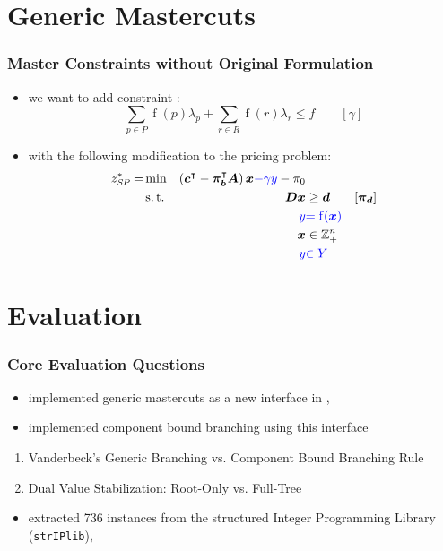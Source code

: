 \documentclass[compress,beamer,aspectratio=169,english,usenames,dvipsnames]{beamer}
\begin{document}
\section{Generic Mastercuts}

\begin{frame}
\frametitle{Master Constraints without Original Formulation}

\begin{itemize}
\item	we want to add constraint \MP{}:
		\begin{equation*}
		\sum_{p \in P} \operatorname{f}(p) \lambda_p + \sum_{r \in R} \operatorname{f}(r) \lambda_r \leq f \qquad \left[\gamma\right]
		\end{equation*}
\item	with the following modification to the pricing problem:
		\begin{equation*}
		\begin{aligned}
		z^*_\SP{} = &\min & \left( \mat{c}\transpose - \mat{\pi}_\mat{b}\transpose \mat{A} \right) \mat{x} {\color{blue} -\gamma y} - \pi_0 & & \\
		&\st & \mat{D} \mat{x} & \geq \mat{d} & \left[\mat{\pi}_\mat{d}\right] \\
		&& {\color{blue} y} & {\color{blue} = \operatorname{f}(\mat{x})} & \\
		&& \mat{x} & \in \mathbb{Z}_+^n \\
		&& {\color{blue} y} & {\color{blue} \in Y}
		\end{aligned}
		\end{equation*}
\end{itemize}
\end{frame}

\section{Evaluation}

\begin{frame}
\frametitle{Core Evaluation Questions}


\begin{itemize}
\item	implemented generic mastercuts as a new interface in \GCG{}, \cite{gamrath2010generic}
\item	implemented component bound branching using this interface
\end{itemize}
\vspace{1em}
\pause
\begin{enumerate}
\item	Vanderbeck's Generic Branching vs. Component Bound Branching Rule
\item	Dual Value Stabilization: Root-Only vs. Full-Tree
\end{enumerate}
\vspace{1em}
\pause
\begin{itemize}
\item	extracted 736 instances from the structured Integer Programming Library (\texttt{strIPlib}), \cite{strIPlib}
\end{itemize}
\end{frame}
\end{document}
